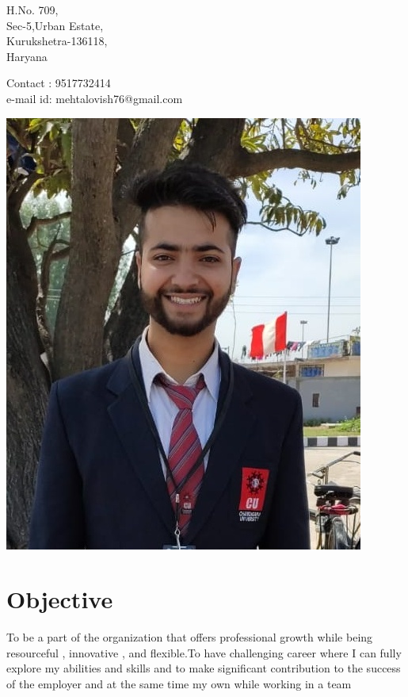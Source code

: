 \documentclass[11pt]{article}
\begin{document}
\noindent\begin{minipage}{0.5\textwidth}      
\begin{flushleft}
H.No. 709, \\                                      %
Sec-5,Urban Estate,\\
Kurukshetra-136118,\\
Haryana
\end{flushleft}
\end{minipage}
\noindent\begin{minipage}{0.5\textwidth}
\begin{flushright}                                 %
     Contact  : 9517732414\\
e-mail id: mehtalovish76@gmail.com\\
\end{flushright}
\end{minipage}

\begin{flushright}
\includegraphics[scale=0.18]{profile.jpeg}      %
\end{flushright}


\section{Objective}
To be a part of the organization that offers professional growth while being resourceful , innovative , and flexible.To have challenging career where I can fully explore my abilities and skills and to make significant contribution to the success of the employer and at the same time my own while working in a team\\
\end{document}

